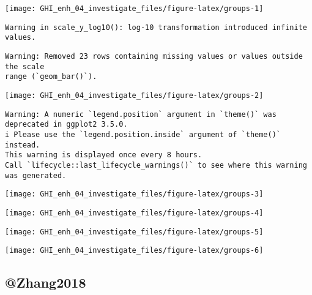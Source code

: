 \documentclass[
  10pt,
  a4paper,oneside]{article}
\begin{document}
\begin{center}\texttt{[image: GHI\_enh\_04\_investigate\_files/figure-latex/groups-1]} \end{center}

\begin{verbatim}
Warning in scale_y_log10(): log-10 transformation introduced infinite values.
\end{verbatim}

\begin{verbatim}
Warning: Removed 23 rows containing missing values or values outside the scale
range (`geom_bar()`).
\end{verbatim}

\begin{center}\texttt{[image: GHI\_enh\_04\_investigate\_files/figure-latex/groups-2]} \end{center}

\begin{verbatim}
Warning: A numeric `legend.position` argument in `theme()` was deprecated in ggplot2 3.5.0.
i Please use the `legend.position.inside` argument of `theme()` instead.
This warning is displayed once every 8 hours.
Call `lifecycle::last_lifecycle_warnings()` to see where this warning was generated.
\end{verbatim}

\begin{center}\texttt{[image: GHI\_enh\_04\_investigate\_files/figure-latex/groups-3]} \end{center}

\begin{center}\texttt{[image: GHI\_enh\_04\_investigate\_files/figure-latex/groups-4]} \end{center}

\begin{center}\texttt{[image: GHI\_enh\_04\_investigate\_files/figure-latex/groups-5]} \end{center}

\begin{center}\texttt{[image: GHI\_enh\_04\_investigate\_files/figure-latex/groups-6]} \end{center}

\hypertarget{zhang2018}{%
\subsection{@Zhang2018}\label{zhang2018}}
\end{document}

